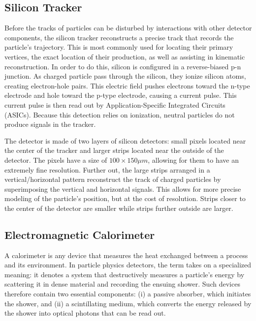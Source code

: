 \subsection{Silicon Tracker}

Before the tracks of particles can be disturbed by interactions with other detector components, the silicon tracker reconstructs a precise track that records the particle's trajectory. This is most commonly used for locating their primary vertices, the exact location of their production, as well as assisting in kinematic reconstruction. In order to do this, silicon is configured in a reverse-biased p-n junction. As charged particle pass through the silicon, they ionize silicon atoms, creating electron-hole pairs. This electric field pushes electrons toward the n-type electrode and hole toward the p-type electrode, causing a current pulse. This current pulse is then read out by Application-Specific Integrated Circuits (ASICs). Because this detection relies on ionization, neutral particles do not produce signals in the tracker.

The detector is made of two layers of silicon detectors: small pixels located near the center of the tracker and larger strips located near the outside of the detector. The pixels have a size of $100 \times 150 \mu m$, allowing for them to have an extremely fine resolution. Further out, the large strips arranged in a vertical/horizontal pattern reconstruct the track of charged particles by superimposing the vertical and horizontal signals. This allows for more precise modeling of the particle's position, but at the cost of resolution. Strips closer to the center of the detector are smaller while strips further outside are larger. 

\subsection{Electromagnetic Calorimeter}
A calorimeter is any device that measures the heat exchanged between a process and its environment.  In particle physics detectors, the term takes on a specialized meaning: it denotes a system that destructively measures a particle's energy by scattering it in dense material and recording the ensuing shower.  Such devices therefore contain two essential components: (i) a passive absorber, which initiates the shower, and (ii) a scintillating medium, which converts the energy released by the shower into optical photons that can be read out.

